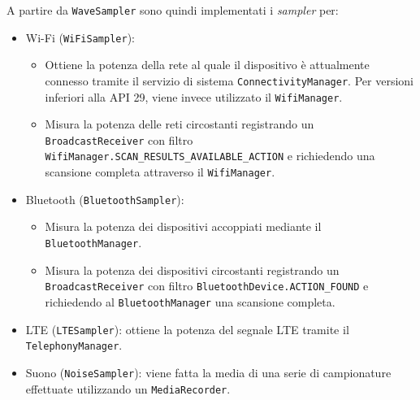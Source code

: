 A partire da \texttt{WaveSampler} sono quindi implementati i \textit{sampler} per:
\begin{itemize}
  \item Wi-Fi (\texttt{WiFiSampler}): 
    \begin{itemize}[topsep=0em]
      \item Ottiene la potenza della rete al quale il dispositivo è attualmente connesso tramite il servizio di sistema \texttt{ConnectivityManager}. Per versioni inferiori alla API 29, viene invece utilizzato il \texttt{WifiManager}.
      \item Misura la potenza delle reti circostanti registrando un \texttt{BroadcastReceiver} con filtro \texttt{WifiManager.SCAN\_RESULTS\_AVAILABLE\_ACTION} e richiedendo una scansione completa attraverso il \texttt{WifiManager}.
    \end{itemize}
  \item Bluetooth (\texttt{BluetoothSampler}):
    \begin{itemize}[topsep=0em]
      \item Misura la potenza dei dispositivi accoppiati mediante il \texttt{BluetoothManager}.
      \item Misura la potenza dei dispositivi circostanti registrando un \texttt{BroadcastReceiver} con filtro \texttt{BluetoothDevice.ACTION\_FOUND} e richiedendo al \texttt{BluetoothManager} una scansione completa.
    \end{itemize}
  \item LTE (\texttt{LTESampler}): ottiene la potenza del segnale LTE tramite il \texttt{TelephonyManager}.
  \item Suono (\texttt{NoiseSampler}): viene fatta la media di una serie di campionature effettuate utilizzando un \texttt{MediaRecorder}.
\end{itemize}